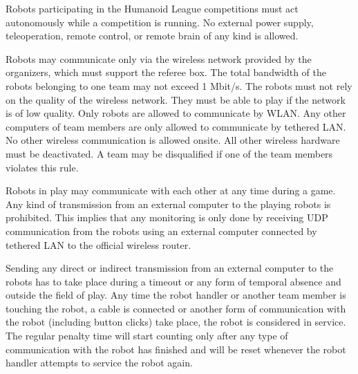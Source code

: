 \headlinebox

Robots participating in the Humanoid League competitions must act autonomously while a competition is running. No external power supply, teleoperation, remote control, or remote brain of any kind is allowed.

\bigskip

Robots may communicate only via the wireless network provided by the organizers, which must support the referee box. The total bandwidth of the robots belonging to one team may not exceed 1 Mbit/s. The robots must not rely on the quality of the wireless network. They
must be able to play if the network is of low quality. Only robots are allowed to communicate by WLAN. Any other computers of team members are only allowed to communicate by tethered LAN. No other wireless communication is allowed onsite. All other wireless hardware must be deactivated. A team may be disqualified if one of the team members violates this rule.

\bigskip

Robots in play may communicate with each other at any time during a game.
Any kind of transmission from an external computer
 to the playing robots is prohibited.
This implies that any monitoring is only done by receiving UDP communication
from the robots using an external computer connected by tethered LAN to the
official wireless router. 


\bigskip

Sending any direct or indirect transmission from an external computer to the
robots has to take place during a timeout or any form of temporal absence and
outside the field of play.
Any time the robot handler or another team member is touching the robot,
a cable is connected or another form of communication with the robot
(including button clicks) take place, the robot is considered in service.
The regular penalty time will start counting only after any type of
communication with the robot has finished and will be reset whenever the robot
handler attempts to service the robot again.

